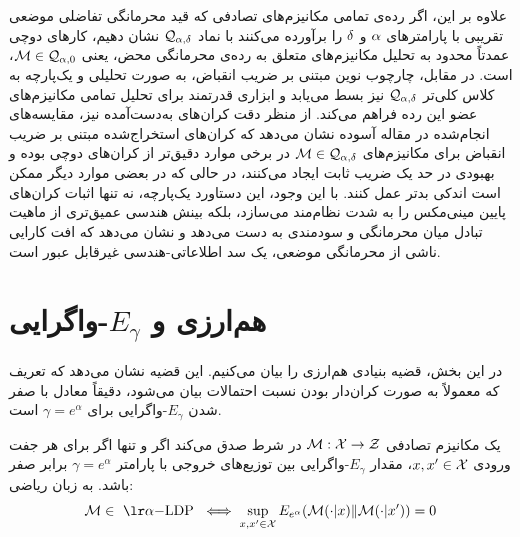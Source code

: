 علاوه بر این، اگر رده‌ی تمامی مکانیزم‌های تصادفی که قید محرمانگی تفاضلی موضعی تقریبی با پارامترهای $\alpha$ و $\delta$ را برآورده می‌کنند با نماد $\mathcal{Q}_{\alpha,\delta}$ نشان دهیم، کارهای دوچی عمدتاً محدود به تحلیل مکانیزم‌های متعلق به رده‌ی محرمانگی محض، یعنی $\mech \in \mathcal{Q}_{\al,0}$، است. در مقابل، چارچوب نوین مبتنی بر ضریب انقباض، به صورت تحلیلی و یک‌پارچه به کلاس کلی‌تر $\mathcal{Q}_{\alpha,\delta}$ نیز بسط می‌یابد و ابزاری قدرتمند برای تحلیل تمامی مکانیزم‌های عضو این رده فراهم می‌کند. از منظر دقت کران‌های به‌دست‌آمده نیز، مقایسه‌های انجام‌شده در مقاله آسوده نشان می‌دهد که کران‌های استخراج‌شده مبتنی بر ضریب انقباض برای مکانیزم‌های $\mech \in \mathcal{Q}_{\al,\del}$ در برخی موارد دقیق‌تر از کران‌های دوچی بوده و بهبودی در حد یک ضریب ثابت ایجاد می‌کنند، در حالی که در بعضی موارد دیگر ممکن است اندکی بدتر عمل کنند. با این وجود، این دستاورد یک‌پارچه، نه تنها اثبات کران‌های پایین مینی‌مکس را به شدت نظام‌مند می‌سازد، بلکه بینش هندسی عمیق‌تری از ماهیت تبادل میان محرمانگی و سودمندی به دست می‌دهد و نشان می‌دهد که افت کارایی ناشی از محرمانگی موضعی، یک سد اطلاعاتی-هندسی غیرقابل عبور است.


\section{هم‌ارزی  و $E_\gamma$-واگرایی}
\label{sec:egamma:equivalence}

در این بخش، قضیه بنیادی هم‌ارزی را بیان می‌کنیم. این قضیه نشان می‌دهد که تعریف  که معمولاً به صورت کران‌دار بودن نسبت احتمالات بیان می‌شود، دقیقاً معادل با صفر شدن $E_\gamma$-واگرایی برای $\gamma = e^\alpha$ است.

\begin{قضیه}
\label{eq:egamma:equi}
یک مکانیزم تصادفی $\mech: \Xset \to \Zset$ در شرط  صدق می‌کند اگر و تنها اگر برای هر جفت ورودی $x, x' \in \Xset$، مقدار $E_\gamma$-واگرایی بین توزیع‌های خروجی با پارامتر $\gamma = e^\alpha$ برابر صفر باشد. به زبان ریاضی:
\begin{equation}
\mech \in \text{\LDP} \iff \sup_{x, x' \in \Xset} E_{e^\alpha}(\mech(\cdot|x) \| \mech(\cdot|x')) = 0
\end{equation}
\end{قضیه}


